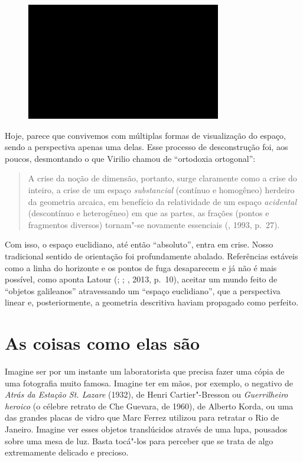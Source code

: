 \begin{figure}[!ht]
\centering
 \includegraphics[width=85mm]{./imgs/im1.jpg}
\caption{\tiny{}} 
\end{figure}

Hoje, parece que convivemos com múltiplas formas de visualização do
espaço, sendo a perspectiva apenas uma delas. Esse processo de
desconstrução foi, aos poucos, desmontando o que Virilio chamou de
``ortodoxia ortogonal'':

\begin{quote}
A crise da noção de dimensão, portanto, surge claramente como a crise do
inteiro, a crise de um espaço \emph{substancial} (contínuo e homogêneo)
herdeiro da geometria arcaica, em benefício da relatividade de um espaço
\emph{acidental} (descontínuo e heterogêneo) em que as partes, as
frações (pontos e fragmentos diversos) tornam"-se novamente essenciais
(, 1993, p.~27).
\end{quote}

Com isso, o espaço euclidiano, até então ``absoluto'', entra em crise.
Nosso tradicional sentido de orientação foi profundamente abalado.
Referências estáveis como a linha do horizonte e os pontos de fuga
desaparecem e já não é mais possível, como aponta Latour (;
; , 2013, p.~10), aceitar um mundo feito de
``objetos galileanos'' atravessando um ``espaço euclidiano'', que a
perspectiva linear e, posteriormente, a geometria descritiva haviam
propagado como perfeito.

\chapter{As coisas como elas são}

Imagine ser por um instante um laboratorista que precisa fazer uma cópia
de uma fotografia muito famosa. Imagine ter em mãos, por exemplo, o
negativo de \emph{Atrás da Estação St. Lazare} (1932), de Henri Cartier"-Bresson ou \emph{Guerrilheiro heroico} (o célebre retrato de Che
Guevara, de 1960), de Alberto Korda, ou uma das grandes placas de vidro
que Marc Ferrez utilizou para retratar o Rio de Janeiro. Imagine ver
esses objetos translúcidos através de uma lupa, pousados sobre uma mesa
de luz. Basta tocá"-los para perceber que se trata de algo extremamente
delicado e precioso.

